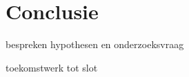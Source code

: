 \chapter{Conclusie}
\label{chap:conclusie}








bespreken hypothesen en onderzoeksvraag

toekomstwerk
tot slot